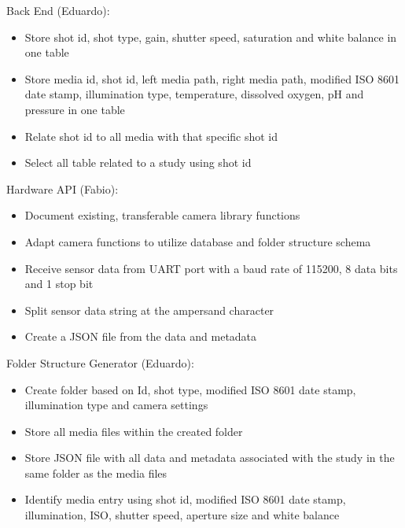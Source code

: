 Back End (Eduardo):
\begin{itemize}
	\item Store shot id, shot type, gain, shutter speed, saturation and white balance in one table
	\item Store media id, shot id, left media path, right media path, modified ISO 8601 date stamp, illumination type, temperature, dissolved oxygen, pH and pressure in one table
	\item Relate shot id to all media with that specific shot id
	\item Select all table related to a study using shot id
\end{itemize}
Hardware API (Fabio):
\begin{itemize}
	\item Document existing, transferable camera library functions
	\item Adapt camera functions to utilize database and folder structure schema
	\item Receive sensor data from UART port with a baud rate of 115200, 8 data bits and 1 stop bit
	\item Split sensor data string at the ampersand character
	\item Create a JSON file from the data and metadata
\end{itemize}
Folder Structure Generator (Eduardo):
\begin{itemize}
	\item Create folder based on Id, shot type, modified ISO 8601 date stamp, illumination type and camera settings
	\item Store all media files within the created folder
	\item Store JSON file with all data and metadata associated with the study in the same folder as the media files
	\item Identify media entry using shot id, modified ISO 8601 date stamp, illumination, ISO, shutter speed, aperture size and white balance
\end{itemize}